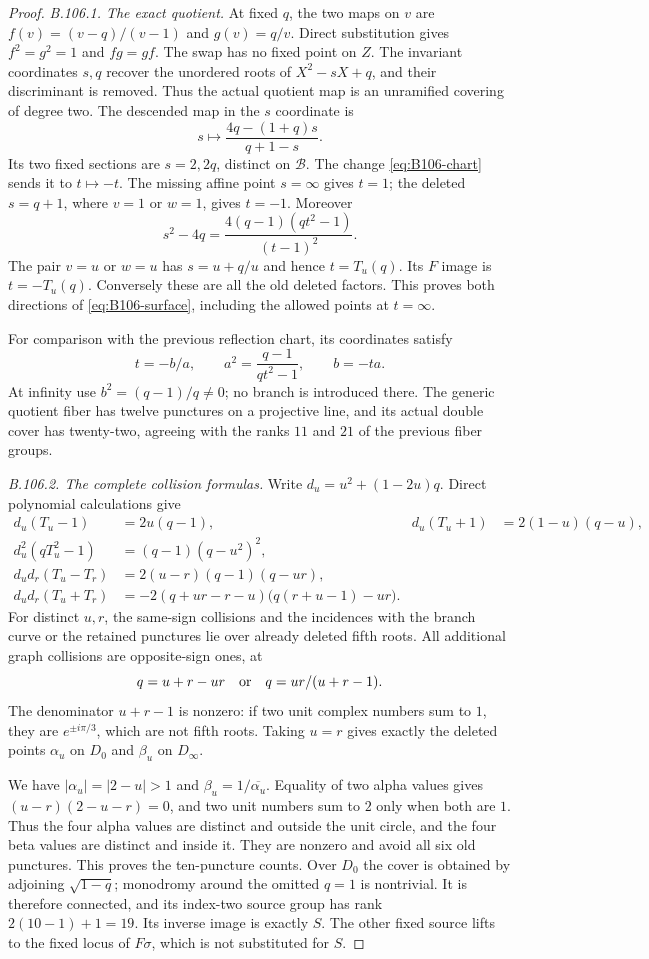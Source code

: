 \begin{proof}
\emph{B.106.1. The exact quotient.}
At fixed $q$, the two maps on $v$ are
$f(v)=(v-q)/(v-1)$ and $g(v)=q/v$. Direct substitution gives
$f^2=g^2=1$ and $fg=gf$. The swap has no fixed point on $Z$.
The invariant coordinates $s,q$ recover the unordered roots of
$X^2-sX+q$, and their discriminant is removed. Thus the actual
quotient map is an unramified covering of degree two.
The descended map in the $s$ coordinate is
\[
 s\longmapsto\frac{4q-(1+q)s}{q+1-s}.
\]
Its two fixed sections are $s=2,2q$, distinct on $\mathscr B$.
The change \eqref{eq:B106-chart} sends it to $t\mapsto-t$.
The missing affine point $s=\infty$ gives $t=1$; the deleted
$s=q+1$, where $v=1$ or $w=1$, gives $t=-1$.
Moreover
\[
 s^2-4q=\frac{4(q-1)(qt^2-1)}{(t-1)^2}.
\]
The pair $v=u$ or $w=u$ has $s=u+q/u$ and hence $t=T_u(q)$.
Its $F$ image is $t=-T_u(q)$. Conversely these are all the old
deleted factors. This proves both directions of
\eqref{eq:B106-surface}, including the allowed points at $t=\infty$.

For comparison with the previous reflection chart, its coordinates
satisfy
\[
 t=-b/a,\qquad a^2=\frac{q-1}{qt^2-1},\qquad b=-ta.
\]
At infinity use $b^2=(q-1)/q\ne0$; no branch is introduced there.
The generic quotient fiber has twelve punctures on a projective
line, and its actual double cover has twenty-two, agreeing with
the ranks $11$ and $21$ of the previous fiber groups.

\emph{B.106.2. The complete collision formulas.}
Write $d_u=u^2+(1-2u)q$. Direct polynomial calculations give
\begin{align*}
 d_u(T_u-1)&=2u(q-1),&
 d_u(T_u+1)&=2(1-u)(q-u),\\
 d_u^2(qT_u^2-1)&=(q-1)(q-u^2)^2,\\
 d_ud_r(T_u-T_r)&=2(u-r)(q-1)(q-ur),\\
 d_ud_r(T_u+T_r)&=-2(q+ur-r-u)\bigl(q(r+u-1)-ur\bigr).
\end{align*}
For distinct $u,r$, the same-sign collisions and the incidences
with the branch curve or the retained punctures lie over already
deleted fifth roots. All additional graph collisions are opposite-sign
ones, at
\[
 q=u+r-ur\quad\hbox{or}\quad q=ur/(u+r-1).
\]
The denominator $u+r-1$ is nonzero: if two unit complex numbers
sum to $1$, they are $e^{\pm i\pi/3}$, which are not fifth roots.
Taking $u=r$ gives exactly the deleted points $\alpha_u$ on $D_0$
and $\beta_u$ on $D_\infty$.

We have $|\alpha_u|=|2-u|>1$ and
$\beta_u=1/\overline{\alpha_u}$. Equality of two alpha values gives
$(u-r)(2-u-r)=0$, and two unit numbers sum to $2$ only when both
are $1$. Thus the four alpha values are distinct and outside the
unit circle, and the four beta values are distinct and inside it.
They are nonzero and avoid all six old punctures. This proves the
ten-puncture counts. Over $D_0$ the cover is obtained by adjoining
$\sqrt{1-q}$; monodromy around the omitted $q=1$ is nontrivial.
It is therefore connected, and its index-two source group has
rank $2(10-1)+1=19$. Its inverse image is exactly $S$.
The other fixed source lifts to the fixed locus of $F\sigma$,
which is not substituted for $S$.


\end{proof}
